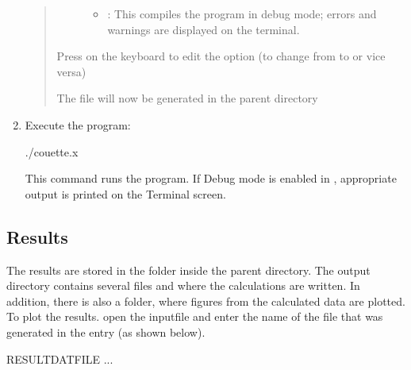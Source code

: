 \documentclass[letterpaper,10pt,english]{sphinxmanual}
\begin{document}
\begin{enumerate}
\begin{quote}
\begin{description}
\begin{itemize}
\item {} 
:   This compiles the program in debug mode; errors and warnings are displayed on the terminal.

\end{itemize}

\end{description}

Press \sphinxcode{{[}Enter{]}} on the keyboard to edit the option (to change from  to  or vice versa)

The file  will now be generated in the parent directory
\end{quote}

\item {} 
Execute the program:

\begin{sphinxVerbatim}[commandchars=\\\{\}]
\PYGZdl{} ./couette.x
\end{sphinxVerbatim}

This command runs the program. If Debug mode is enabled in , appropriate output is printed on the Terminal screen.

\end{enumerate}


\subsection{Results}
\label{\detokenize{setup:results}}\label{\detokenize{setup:id3}}
The results are stored in the  folder inside the parent directory. The output directory contains several files  and  where the calculations are written. In addition, there is also a  folder, where figures from the calculated data are plotted. To plot the results. open the inputfile and enter the name of the  file that was generated in the  entry (as shown below).

\begin{sphinxVerbatim}[commandchars=\\\{\}]
       RESULTDATFILE
       ...
\end{sphinxVerbatim}
\end{document}
